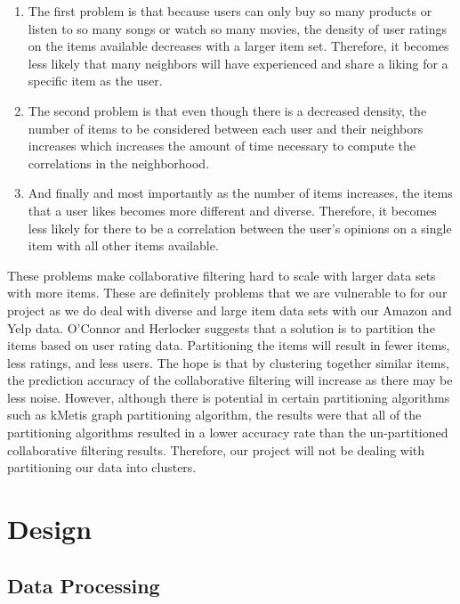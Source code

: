 \documentclass[conference]{IEEEtran}
\begin{document}
\begin{enumerate}
  \item The first problem is that because users can only buy so many products or listen to so many songs or watch so many
        movies, the density of user ratings on the items available decreases with a larger item set.  Therefore, it becomes 
        less likely that many neighbors will have experienced and share a liking for a specific item as the user.
  \item The second problem is that even though there is a decreased density, the number of items to be considered between 
        each user and their neighbors increases which increases the amount of time necessary to compute the correlations in 
        the neighborhood.
  \item And finally and most importantly as the number of items increases, the items that a user likes becomes more different
        and diverse.  Therefore, it becomes less likely for there to be a correlation between the user’s opinions on a single
        item with all other items available.
\end{enumerate}

These problems make collaborative filtering hard to scale with larger data sets with more items.  These are definitely problems that we are vulnerable to for our project as we do deal with diverse and large item data sets with our Amazon and Yelp data.  O’Connor and Herlocker \cite{ClusteringItems} suggests that a solution is to partition the items based on user rating data.  Partitioning the items will result in fewer items, less ratings, and less users.  The hope is that by clustering together similar items, the prediction accuracy of the collaborative filtering will increase as there may be less noise.  However, although there is potential in certain partitioning algorithms such as kMetis graph partitioning algorithm, the results were that all of the partitioning algorithms resulted in a lower accuracy rate than the un-partitioned collaborative filtering results.  Therefore, our project will not be dealing with partitioning our data into clusters. 

\section{Design}

\subsection{Data Processing}
\end{document}

